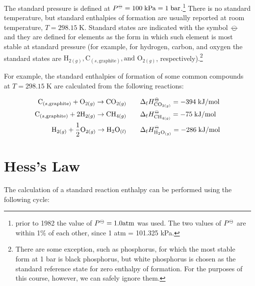 \documentclass[
]{book}
\theoremstyle{definition}
\theoremstyle{definition}
\theoremstyle{definition}
\theoremstyle{remark}
\begin{document}
The standard pressure is defined at \(P^{{-\kern-6pt{\ominus}\kern-6pt-}} = 100 \; \mathrm{kPa} = 1 \; \mathrm{bar}\).\footnote{prior to 1982 the value of \(P^{{-\kern-6pt{\ominus}\kern-6pt-}} = 1.0 \mathrm{ atm}\) was used. The two values of \(P^{-\kern-6pt{\ominus}\kern-6pt-}\) are within 1\% of each other, since 1 atm = 101.325 kPa.} There is no standard temperature, but standard enthalpies of formation are usually reported at room temperature, \(T = 298.15 \; \mathrm{K}\). Standard states are indicated with the symbol \({-\kern-6pt{\ominus}\kern-6pt-}\) and they are defined for elements as the form in which such element is most stable at standard pressure (for example, for hydrogen, carbon, and oxygen the standard states are \(\mathrm{H}_{2(g)}, \mathrm{C}_{(s,\text{graphite})}, \text{and }\mathrm{O}_{2(g)}\), respectively).\footnote{There are some exception, such as phosphorus, for which the most stable form at 1 bar is black phosphorus, but white phosphorus is chosen as the standard reference state for zero enthalpy of formation. For the purposes of this course, however, we can safely ignore them.}

For example, the standard enthalpies of formation of some common compounds at \(T = 298.15 \; \mathrm{K}\) are calculated from the following reactions:

\begin{equation}
\begin{aligned}
  \mathrm{C}_{(s,\text{graphite})}+\mathrm{O}_{2(g)} \rightarrow \mathrm{CO}_{2(g)} \qquad & \Delta_{\mathrm{f}} H_{\mathrm{CO}_{2(g)}}^{-\kern-6pt{\ominus}\kern-6pt-}= -394 \; \text{kJ/mol} \\
   \mathrm{C}_{(s,\text{graphite})}+2 \mathrm{H}_{2(g)} \rightarrow \mathrm{CH}_{4(g)} \qquad & \Delta_{\mathrm{f}} H_{\mathrm{CH}_{4(g)}}^{-\kern-6pt{\ominus}\kern-6pt-}= -75 \; \text{kJ/mol} \\ 
   \mathrm{H}_{2(g)}+\frac{1}{2} \mathrm{O}_{2(g)} \rightarrow \mathrm{H}_2 \mathrm{O}_{(l)} \qquad & \Delta_{\mathrm{f}} H_{\mathrm{H}_2 \mathrm{O}_{(g)}}^{-\kern-6pt{\ominus}\kern-6pt-}= -286 \; \text{kJ/mol} 
\end{aligned}
\label{eq:someDfH}
\end{equation}

\hypertarget{hessslaw}{%
\section{Hess's Law}\label{hessslaw}}

The calculation of a standard reaction enthalpy can be performed using the following cycle:
\end{document}
